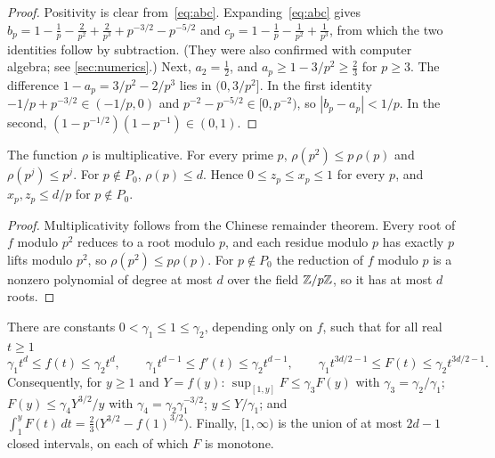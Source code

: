 \begin{proof}
Positivity is clear from~\eqref{eq:abc}. Expanding~\eqref{eq:abc} gives $b_p=1-\frac1p-\frac2{p^2}+\frac2{p^3}+p^{-3/2}-p^{-5/2}$ and $c_p=1-\frac1p-\frac1{p^2}+\frac1{p^3}$, from which the two identities follow by subtraction. (They were also confirmed with computer algebra; see \cref{sec:numerics}.) Next, $a_2=\frac12$, and $a_p\ge1-3/p^2\ge\frac23$ for $p\ge3$. The difference $1-a_p=3/p^2-2/p^3$ lies in $(0,3/p^2]$. In the first identity $-1/p+p^{-3/2}\in(-1/p,0)$ and $p^{-2}-p^{-5/2}\in[0,p^{-2})$, so $|b_p-a_p|<1/p$. In the second, $(1-p^{-1/2})(1-p^{-1})\in(0,1)$.
\end{proof}

\begin{lemma}\label{lem:rho}
The function $\rho$ is multiplicative. For every prime $p$, $\rho(p^2)\le p\,\rho(p)$ and $\rho(p^j)\le p^j$. For $p\notin P_0$, $\rho(p)\le d$. Hence $0\le z_p\le x_p\le1$ for every $p$, and $x_p,z_p\le d/p$ for $p\notin P_0$.
\end{lemma}

\begin{proof}
Multiplicativity follows from the Chinese remainder theorem. Every root of $f$ modulo $p^2$ reduces to a root modulo $p$, and each residue modulo $p$ has exactly $p$ lifts modulo $p^2$, so $\rho(p^2)\le p\rho(p)$. For $p\notin P_0$ the reduction of $f$ modulo $p$ is a nonzero polynomial of degree at most $d$ over the field $\mathbb{Z}/p\mathbb{Z}$, so it has at most $d$ roots.
\end{proof}

\begin{lemma}[Shape of $F$]\label{lem:shape}
There are constants $0<\gamma_1\le1\le\gamma_2$, depending only on $f$, such that for all real $t\ge1$
\begin{equation}\label{eq:shape}
\gamma_1t^d\le f(t)\le\gamma_2t^d,\qquad\gamma_1t^{d-1}\le f'(t)\le\gamma_2t^{d-1},\qquad\gamma_1t^{3d/2-1}\le F(t)\le\gamma_2t^{3d/2-1}.
\end{equation}
Consequently, for $y\ge1$ and $Y=f(y)$: $\sup_{[1,y]}F\le\gamma_3F(y)$ with $\gamma_3=\gamma_2/\gamma_1$; $F(y)\le\gamma_4Y^{3/2}/y$ with $\gamma_4=\gamma_2\gamma_1^{-3/2}$; $y\le Y/\gamma_1$; and $\int_1^yF(t)\,dt=\frac23\bigl(Y^{3/2}-f(1)^{3/2}\bigr)$. Finally, $[1,\infty)$ is the union of at most $2d-1$ closed intervals, on each of which $F$ is monotone.
\end{lemma}

